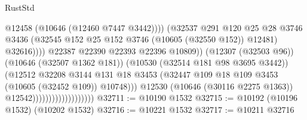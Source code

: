 \begin{lexlean}{RustStd}
\begin{coremodule}
                                                          @12458
                                                          (@10646 (@12460 @7447 @3442))))
                                                      (@32537
                                                        @291
                                                        @120
                                                        @25
                                                        @28
                                                        @3746
                                                        @3436
                                                        (@32545
                                                          @152
                                                          @25
                                                          @152
                                                          @3746
                                                          (@10605 (@32550 @152))
                                                          @12481)
                                                        @32616))))
                                                @22387
                                                @22390
                                                @22393
                                                @22396
                                                @10809))
                                            (@12307 (@32503 @96))
                                            (@10646 (@32507 @1362 @181))
                                            (@10530 (@32514 @181 @98 @3695 @3442))
                                            (@12512
                                              @32208
                                              @3144
                                              @131
                                              @18
                                              @3453
                                              (@32447
                                                @109
                                                @18
                                                @109
                                                @3453
                                                (@10605 (@32452 @109))
                                                @10748)))
                                          @12530
                                          (@10646 (@30116 @2275 @1363))
                                          @12542)))))))))))))))))))
@32711 := @10190 @1532
@32715 := @10192 (@10196 @1532) (@10202 @1532)
@32716 := @10221 @1532
@32717 := @10211 @32716

\end{coremodule}
\end{lexlean}
